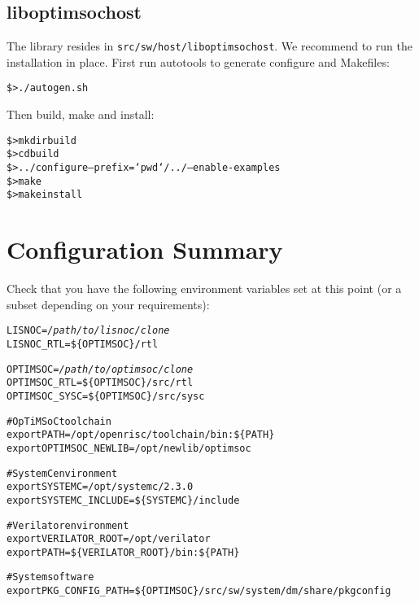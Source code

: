 \subsection{liboptimsochost}

The library resides in \verb|src/sw/host/liboptimsochost|. We
recommend to run the installation in place. First run autotools to
generate configure and Makefiles:

\begin{alltt}
\$> ./autogen.sh
\end{alltt}

Then build, make and install:

\begin{alltt}
\$> mkdir build
\$> cd build
\$> ../configure --prefix=`pwd`/../ --enable-examples
\$> make
\$> make install
\end{alltt}

\section{Configuration Summary}

Check that you have the following environment variables set at this
point (or a subset depending on your requirements):

\begin{alltt}
LISNOC = \emph{/path/to/lisnoc/clone}
LISNOC_RTL = \$\{OPTIMSOC\}/rtl

OPTIMSOC = \emph{/path/to/optimsoc/clone}
OPTIMSOC_RTL = \$\{OPTIMSOC\}/src/rtl
OPTIMSOC_SYSC = \$\{OPTIMSOC\}/src/sysc


# OpTiMSoC toolchain
export PATH=/opt/openrisc/toolchain/bin:\$\{PATH\}
export OPTIMSOC_NEWLIB=/opt/newlib/optimsoc

# SystemC environment
export SYSTEMC=/opt/systemc/2.3.0
export SYSTEMC_INCLUDE=\$\{SYSTEMC\}/include

# Verilator environment
export VERILATOR\_ROOT=/opt/verilator
export PATH=\$\{VERILATOR_ROOT\}/bin:\$\{PATH\}

# System software
export PKG_CONFIG_PATH=\$\{OPTIMSOC\}/src/sw/system/dm/share/pkgconfig


\end{alltt}